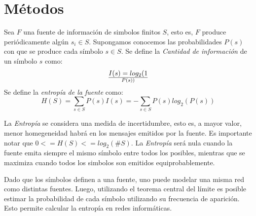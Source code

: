 \section{M\'etodos}

Sea $F$ una fuente de informaci\'on de simbolos finitos $S$, esto es, $F$ 
produce peri\'odicamente alg\'un $s_i \in S$. Supongamos conocemos las 
probabilidades $P(s)$ con que se produce cada s\'imbolo $s \in S$. 
Se define la \textit{Cantidad de informaci\'on} de un s\'imbolo $s$ como: 
$$I(s) = log_2({1}\over{P(s)} )$$
Se define la \textit{entrop\'ia de la fuente} como:
$$ H(S) = \sum_{s \in S}{P(s)I(s)} = - \sum_{s \in S}{P(s) log_2(P(s))}$$

La \textit{Entrop\'ia} se considera una medida de incertidumbre, esto es, 
a mayor valor, menor homegeneidad habr\'a en los mensajes emitidos por
la fuente. Es importante notar que $0 <= H(S) <= log_2(\#S)$. La
\textit{Entrop\'ia} ser\'a nula cuando la fuente emita siempre el mismo 
s\'imbolo entre todos los posibles, mientras que se maximiza cuando todos
los simbolos son emitidos equiprobablemente. 

Dado que los s\'imbolos definen a una fuente, uno puede modelar una misma red  
como distintas fuentes. Luego, utilizando el teorema central del l\'imite es
posible estimar la probabilidad de cada s\'imbolo utilizando su frecuencia
de aparici\'on. Esto permite calcular la entrop\'ia en redes inform\'aticas.

